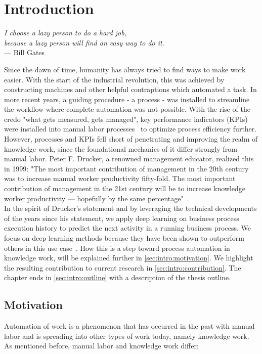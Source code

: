 \chapter{Introduction}\label{sec:intro}
\begin{flushright}{\slshape
I choose a lazy person to do a hard job,\\
because a lazy person will find an easy way to do it.}\\
\medskip
--- Bill Gates
\end{flushright}

\noindent Since the dawn of time, humanity has always tried to find ways to make work easier. With the start of the industrial revolution, this was achieved by constructing machines and other helpful contraptions which automated a task. In more recent years, a guiding procedure - a process - was installed to streamline the workflow where complete automation was not possible. With the rise of the credo "what gets measured, gets managed", key performance indicators (KPIs) were installed into manual labor processes~\cite{web:taylorism-and-drucker} to optimize process efficiency further.\\

However, processes and KPIs fell short of penetrating and improving the realm of knowledge work, since the foundational mechanics of it differ strongly from manual labor. Peter F. Drucker, a renowned management educator, realized this in 1999:
"The most important contribution of management in the 20th century was to increase manual worker productivity fifty-fold. The most important contribution of management in the 21st century will be to increase knowledge worker productivity — hopefully by the same percentage"~\cite{drucker1999}.\\

In the spirit of Drucker's statement and by leveraging the technical developments of the years since his statement, we apply deep learning on business process execution history to predict the next activity in a running business process. We focus on deep learning methods because they have been shown to outperform others in this use case~\cite{tax2018interdisciplinary}. How this is a step toward process automation in knowledge work, will be explained further in \autoref{sec:intro:motivation}.  We highlight the resulting contribution to current research in \autoref{sec:intro:contribution}. The chapter ends in \autoref{sec:intro:outline} with a description of the thesis outline.

\section{Motivation} \label{sec:intro:motivation}
Automation of work is a phenomenon that has occurred in the past with manual labor and is spreading into other types of work today, namely knowledge work. As mentioned before, manual labor and knowledge work differ:

